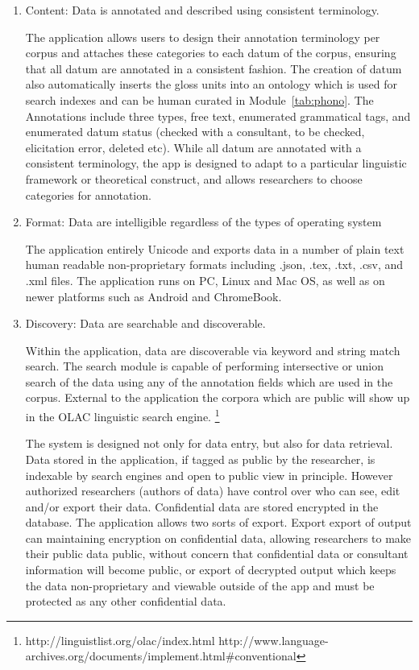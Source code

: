 \documentclass[12 pt]{article}
\begin{document}
\begin{enumerate} 

\item Content: Data is annotated and described using consistent terminology.  

The application allows users to design their annotation terminology per corpus and attaches these categories to each datum of the corpus, ensuring that all datum are annotated in a consistent fashion. The creation of datum also automatically inserts the gloss units into an ontology which is used for search indexes and can be human curated in Module~\ref{tab:phono}. The Annotations include three types, free text, enumerated grammatical tags, and enumerated datum status (checked with a consultant, to be checked, elicitation error, deleted etc). While all datum are annotated with a consistent  terminology, the app is designed to adapt to a particular linguistic framework or theoretical construct, and allows researchers to choose categories for annotation. 

\item Format: Data are intelligible regardless of the types of operating system 

The application entirely Unicode and exports data in  a number of plain text human readable non-proprietary formats including .json, .tex, .txt, .csv, and .xml files. The application runs on PC, Linux and Mac OS, as well as on newer platforms such as Android and ChromeBook. 

\item Discovery: Data are searchable and discoverable. 

Within the application, data are discoverable via keyword and string match search. The search module is capable of performing intersective or union search of the data using any of the annotation fields which are used in the corpus. External to the application the corpora which are public will show up in the OLAC linguistic search engine. \footnote{ http://linguistlist.org/olac/index.html http://www.language-archives.org/documents/implement.html\#conventional}

The system is designed not only for data entry, but also for data retrieval. Data stored in the application, if tagged as public by the researcher, is indexable by search engines and open to public view in principle. However authorized researchers (authors of data) have control over who can see, edit and/or export their data.  
Confidential data are stored encrypted in the database. The application allows two sorts of export. Export export of output can maintaining encryption on confidential data, allowing researchers to make their public data public, without concern that confidential data or consultant information will become public, or export of decrypted output which keeps the data non-proprietary and viewable outside of the app and must be protected as any other confidential data.


\end{enumerate}
\end{document}
